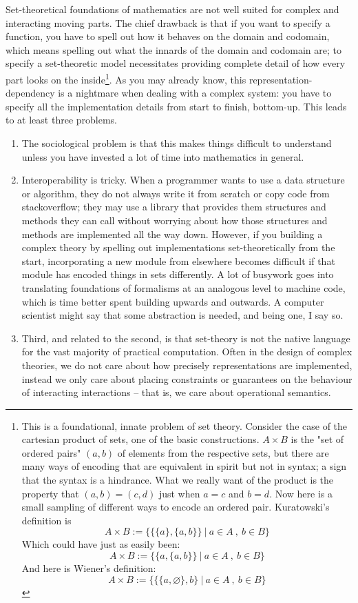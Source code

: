 
Set-theoretical foundations of mathematics are not well suited for complex and interacting moving parts. The chief drawback is that if you want to specify a function, you have to spell out how it behaves on the domain and codomain, which means spelling out what the innards of the domain and codomain are; to specify a set-theoretic model necessitates providing complete detail of how every part looks on the inside\footnote{This is a foundational, innate problem of set theory. Consider the case of the cartesian product of sets, one of the basic constructions. $A \times B$ is the "set of ordered pairs" $(a,b)$ of elements from the respective sets, but there are many ways of encoding that are equivalent in spirit but not in syntax; a sign that the syntax is a hindrance. What we really want of the product is the property that $(a,b) = (c,d)$ just when $a = c$ and $b = d$. Now here is a small sampling of different ways to encode an ordered pair. Kuratowski's definition is
\[A \times B := \bigg\{ \{\{a\},\{a,b\}\} \ | \ a \in A \ , \ b \in B \bigg\}\]
Which could have just as easily been:
\[A \times B := \bigg\{ \{a,\{a,b\}\} \ | \ a \in A \ , \ b \in B \bigg\}\]
And here is Wiener's definition:
\[A \times B := \bigg\{ \{\{a,\varnothing\},b\} \ | \ a \in A \ , \ b \in B \bigg\}\]}. As you may already know, this representation-dependency is a nightmare when dealing with a complex system: you have to specify all the implementation details from start to finish, bottom-up. This leads to at least three problems.
\begin{enumerate}
\item{
The sociological problem is that this makes things difficult to understand unless you have invested a lot of time into mathematics in general.
}
\item{
Interoperability is tricky. When a programmer wants to use a data structure or algorithm, they do not always write it from scratch or copy code from stackoverflow; they may use a library that provides them structures and methods they can call without worrying about how those structures and methods are implemented all the way down. However, if you building a complex theory by spelling out implementations set-theoretically from the start, incorporating a new module from elsewhere becomes difficult if that module has encoded things in sets differently. A lot of busywork goes into translating foundations of formalisms at an analogous level to machine code, which is time better spent building upwards and outwards. A computer scientist might say that some abstraction is needed, and being one, I say so.
}
\item{
Third, and related to the second, is that set-theory is not the native language for the vast majority of practical computation. Often in the design of complex theories, we do not care about how precisely representations are implemented, instead we only care about placing constraints or guarantees on the behaviour of interacting interactions -- that is, we care about operational semantics.
}
\end{enumerate}

